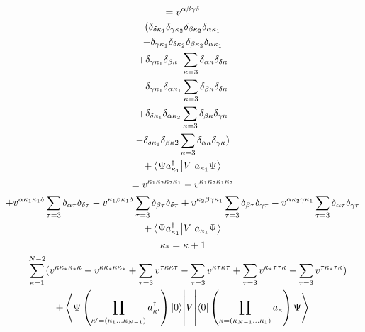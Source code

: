 \documentclass[12pt]{article}
\begin{document}
\begin{multline}
    =v^{\alpha\beta\gamma\delta}\\
    (\delta_{\delta\kappa_{1}}\delta_{\gamma\kappa_{2}}\delta_{\beta\kappa_{2}}\delta_{\alpha\kappa_{1}}\\
    -\delta_{\gamma\kappa_{1}}\delta_{\delta\kappa_{2}}\delta_{\beta\kappa_{2}}\delta_{\alpha\kappa_{1}}\\
    +\delta_{\gamma\kappa_{1}}\delta_{\beta\kappa_{1}}
    \sum_{\kappa=3} \delta_{\alpha\kappa}\delta_{\delta\kappa}\\
    -\delta_{\gamma\kappa_{1}}\delta_{\alpha\kappa_{1}}\sum_{\kappa=3} \delta_{\beta\kappa}\delta_{\delta\kappa}\\
    +\delta_{\delta\kappa_{1}}\delta_{\alpha\kappa_{2}}\sum_{\kappa=3} \delta_{\beta\kappa}\delta_{\gamma\kappa}\\
    -\delta_{\delta\kappa_{1}}\delta_{\beta\kappa2}\sum_{\kappa=3} \delta_{\alpha\kappa}\delta_{\gamma\kappa})\\
    +\mel{\Psi a^{\dag}_{\kappa_{1}}}{V}{a_{\kappa_{1}}\Psi}\\ 
\end{multline}
\begin{multline}
    =
v^{\kappa_{1}\kappa_{2}\kappa_{2}\kappa_{1}}
-v^{\kappa_{1}\kappa_{2}\kappa_{1}\kappa_{2}}\\
+v^{\alpha\kappa_{1}\kappa_{1}\delta}\sum_{\tau=3}\delta_{\alpha\tau}\delta_{\delta\tau}
-v^{\kappa_{1}\beta\kappa_{1}\delta}\sum_{\tau=3}\delta_{\beta\tau}\delta_{\delta\tau}
+v^{\kappa_{2}\beta\gamma\kappa_{1}}\sum_{\tau=3} \delta_{\beta\tau}\delta_{\gamma\tau}
-v^{\alpha\kappa_{2}\gamma\kappa_{1}}\sum_{\tau=3} \delta_{\alpha\tau}\delta_{\gamma\tau}\\
+\mel{\Psi a^{\dag}_{\kappa_{1}}}{V}{a_{\kappa_{1}}\Psi}
\end{multline}
\begin{equation*}
    \kappa_{*}=\kappa+1
\end{equation*}
\begin{multline}
    =\sum_{\kappa=1}^{N-2}(v^{\kappa\kappa_{*}\kappa_{*}\kappa}-v^{\kappa\kappa_{*}\kappa\kappa_{*}}+\sum_{\tau=3} v^{\tau\kappa\kappa\tau}-\sum_{\tau=3} v^{\kappa\tau\kappa\tau}+\sum_{\tau=3}v^{\kappa_{*}\tau\tau\kappa} -\sum_{\tau=3} v^{\tau\kappa_{*}\tau\kappa})\\
    +\mel{\Psi
    \left(\prod_{\kappa^{\prime}=\left(\kappa_{1}\dots\kappa_{N-1}\right)}a^{\dag}_{\kappa^{\prime}}\right)\ket{0}}
    {V}
    {\bra{0}\left(\prod_{\kappa=\left(\kappa_{N-1}\dots\kappa_{1}\right)}a_{\kappa}\right)\Psi}
\end{multline}
\end{document}
